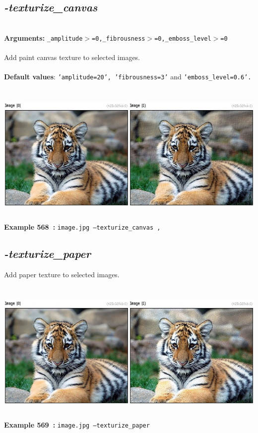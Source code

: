 \documentclass[a4paper,11pt,twoside]{book}
\begin{document}
\subsection{\emph{-texturize\_canvas} }\vspace*{-0.5em}
~\\\textbf{Arguments: } 
{\small \texttt{\_amplitude$>$=0,\_fibrousness$>$=0,\_emboss\_level$>$=0}}\\~\\
Add paint canvas texture to selected images.
~\\~\\\textbf{Default values}: {\small \texttt{'amplitude=20', 'fibrousness=3'} and \texttt{'emboss\_level=0.6'.}}
\begin{center}\includegraphics[keepaspectratio=true,height=7cm,width=\textwidth]{img/gmic_def568.jpg}\\
{\footnotesize \textbf{Example 568~:} \texttt{image.jpg --texturize\_canvas ,}}
\end{center}

\subsection{\emph{-texturize\_paper} }\vspace*{-0.5em}
Add paper texture to selected images.
\begin{center}\includegraphics[keepaspectratio=true,height=7cm,width=\textwidth]{img/gmic_def569.jpg}\\
{\footnotesize \textbf{Example 569~:} \texttt{image.jpg --texturize\_paper}}
\end{center}
\end{document}

